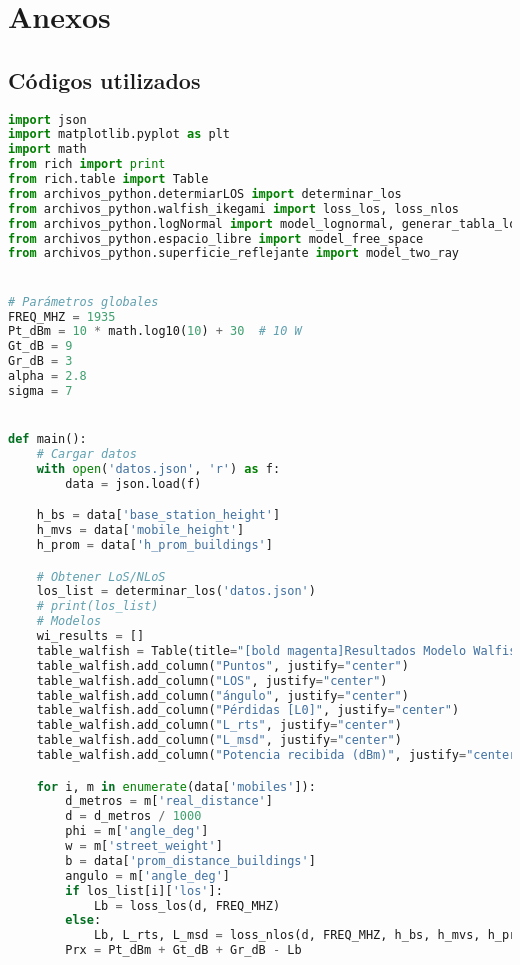 \section{\Large Anexos}
\subsection{Códigos utilizados}

\begin{lstlisting}[language=Python, caption={main.py}]
import json
import matplotlib.pyplot as plt
import math
from rich import print
from rich.table import Table
from archivos_python.determiarLOS import determinar_los
from archivos_python.walfish_ikegami import loss_los, loss_nlos
from archivos_python.logNormal import model_lognormal, generar_tabla_lognormal
from archivos_python.espacio_libre import model_free_space
from archivos_python.superficie_reflejante import model_two_ray


# Parámetros globales
FREQ_MHZ = 1935
Pt_dBm = 10 * math.log10(10) + 30  # 10 W
Gt_dB = 9
Gr_dB = 3
alpha = 2.8
sigma = 7


def main():
    # Cargar datos
    with open('datos.json', 'r') as f:
        data = json.load(f)

    h_bs = data['base_station_height']
    h_mvs = data['mobile_height']
    h_prom = data['h_prom_buildings']

    # Obtener LoS/NLoS
    los_list = determinar_los('datos.json')
    # print(los_list)
    # Modelos
    wi_results = []
    table_walfish = Table(title="[bold magenta]Resultados Modelo Walfish-Ikegami[bold magenta]")
    table_walfish.add_column("Puntos", justify="center")
    table_walfish.add_column("LOS", justify="center")
    table_walfish.add_column("ángulo", justify="center")
    table_walfish.add_column("Pérdidas [L0]", justify="center")
    table_walfish.add_column("L_rts", justify="center")
    table_walfish.add_column("L_msd", justify="center")
    table_walfish.add_column("Potencia recibida (dBm)", justify="center")

    for i, m in enumerate(data['mobiles']):
        d_metros = m['real_distance']
        d = d_metros / 1000
        phi = m['angle_deg']
        w = m['street_weight']
        b = data['prom_distance_buildings']
        angulo = m['angle_deg']
        if los_list[i]['los']:
            Lb = loss_los(d, FREQ_MHZ)
        else:
            Lb, L_rts, L_msd = loss_nlos(d, FREQ_MHZ, h_bs, h_mvs, h_prom, phi, w, b)
        Prx = Pt_dBm + Gt_dB + Gr_dB - Lb


\end{lstlisting}
